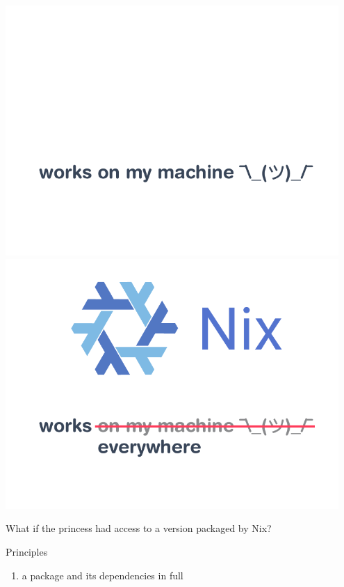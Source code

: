 \documentclass[a4paper]{beamer}
\newcommand{\couleur}[2]{{\color{#1}{#2}}}
\begin{document}
\begin{frame}
     {
        \includegraphics[width=0.95\textwidth]{img/schema-nix-motto-pre.pdf}
    }
     {
        \includegraphics[width=0.95\textwidth]{img/schema-nix-motto.pdf}
    }
\end{frame}

\begin{frame}
What if the princess had access to a version packaged by Nix?
\end{frame}

\begin{frame}
    \begin{block}{Principles}
        \begin{enumerate}
            \item<2-> \couleur{blue-portage}{Describe} a package and its
                dependencies in full
         \end{enumerate}
    \end{block}
\end{frame}
\end{document}
